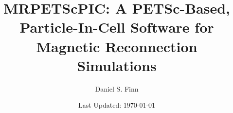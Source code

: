 \documentclass[12pt]{report}
\begin{document}

\title{MRPETScPIC: A PETSc-Based, Particle-In-Cell Software for Magnetic Reconnection Simulations}
\author[1]{Daniel S. Finn}
\date{Last Updated: \today}
\maketitle
{}

\renewcommand{\cftchapdotsep}{\cftdotsep}
\renewcommand\contentsname{Table of Contents}
\begin{singlespace}
\tableofcontents
\end{singlespace}
\clearpage

\begin{singlespace}
	\setlength\cftbeforetabskip{\baselineskip}
	\listoftables
\end{singlespace}
\clearpage

\begin{singlespace}
    \setlength\cftbeforefigskip{\baselineskip}
    \listoffigures
\end{singlespace}
\clearpage


\clearpage
{}
\setcounter{page}{1} %


\clearpage

% 

\begin{singlespace}
	\setlength\bibitemsep{\baselineskip}
	\printbibliography[title={References}]
\end{singlespace}
\end{document}
